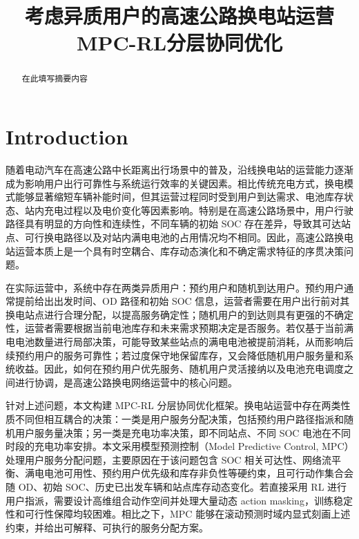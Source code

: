 \documentclass[12pt,hyperref,a4paper,UTF8]{ctexart}
\begin{document}
\cover

\newpage
\begin{abstract}

在此填写摘要内容

\end{abstract}
\newpage

\thispagestyle{empty} %

\newpage
\tableofcontents

\newpage

\begin{center}
   \title{ \Huge \textbf{{考虑异质用户的高速公路换电站运营MPC-RL分层协同优化}}}
\end{center}




\section{Introduction}
随着电动汽车在高速公路中长距离出行场景中的普及，沿线换电站的运营能力逐渐成为影响用户出行可靠性与系统运行效率的关键因素。相比传统充电方式，换电模式能够显著缩短车辆补能时间，但其运营过程同时受到用户到达需求、电池库存状态、站内充电过程以及电价变化等因素影响。特别是在高速公路场景中，用户行驶路径具有明显的方向性和连续性，不同车辆的初始 SOC 存在差异，导致其可达站点、可行换电路径以及对站内满电电池的占用情况均不相同。因此，高速公路换电站运营本质上是一个具有时空耦合、库存动态演化和不确定需求特征的序贯决策问题。

在实际运营中，系统中存在两类异质用户：预约用户和随机到达用户。预约用户通常提前给出出发时间、OD 路径和初始 SOC 信息，运营者需要在用户出行前对其换电站点进行合理分配，以提高服务确定性；随机用户的到达则具有更强的不确定性，运营者需要根据当前电池库存和未来需求预期决定是否服务。若仅基于当前满电电池数量进行局部决策，可能导致某些站点的满电电池被提前消耗，从而影响后续预约用户的服务可靠性；若过度保守地保留库存，又会降低随机用户服务量和系统收益。因此，如何在预约用户优先服务、随机用户灵活接纳以及电池充电调度之间进行协调，是高速公路换电网络运营中的核心问题。

针对上述问题，本文构建 MPC-RL 分层协同优化框架。换电站运营中存在两类性质不同但相互耦合的决策：一类是用户服务分配决策，包括预约用户路径指派和随机用户服务量决策；另一类是充电功率决策，即不同站点、不同 SOC 电池在不同时段的充电功率安排。本文采用模型预测控制（Model Predictive Control, MPC）处理用户服务分配问题，主要原因在于该问题包含 SOC 相关可达性、网络流平衡、满电电池可用性、预约用户优先级和库存非负性等硬约束，且可行动作集合会随 OD、初始 SOC、历史已出发车辆和站点库存动态变化。若直接采用 RL 进行用户指派，需要设计高维组合动作空间并处理大量动态 action masking，训练稳定性和可行性保障均较困难。相比之下，MPC 能够在滚动预测时域内显式刻画上述约束，并给出可解释、可执行的服务分配方案。
\end{document}
